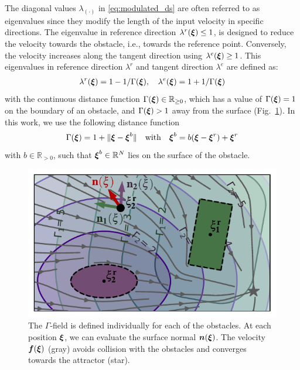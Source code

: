 The  diagonal values $\lambda_{(\cdot)}$  in \eqref{eq:modulated_ds} are often referred to as eigenvalues since they modify the length of the input velocity in specific directions. 
The eigenvalue in reference direction $\lambda^r(\boldsymbol{\xi}) \leq 1$, is designed to reduce the velocity towards the obstacle, i.e., towards the reference point.  
Conversely, the velocity increases along the tangent direction using $\lambda^e(\boldsymbol{\xi}) \geq 1$. This eigenvalues in reference direction $\lambda^r$ and tangent direction $\lambda^e$ are defined as:
\begin{equation}
\begin{split}
    \lambda^r(\vecs \xi) = 1 - 1 /\Gamma(\vecs \xi) , \quad \lambda^e(\vecs \xi) = 1 + 1 / \Gamma(\vecs \xi)
    \label{eq:eigenvalues}
    \end{split}
\end{equation}
with the continuous distance function $\Gamma(\boldsymbol{\xi}) \in \mathbb{R}_{\geq 0}$, which has a value of $\Gamma(\boldsymbol{\xi}) = 1$ on the boundary of an obstacle, and $\Gamma(\boldsymbol{\xi}) > 1$ away from the surface (Fig.~\ref{fig:resultant_normal}). In this work, we use the following distance function
\begin{equation}
  \Gamma(\vecs \xi) = 1 + \| \vecs \xi - \vecs \xi^b \|  
  \quad \text{with} \quad
  \vecs \xi^b = b (\vecs \xi - \vecs \xi^r) + \vecs \xi^r
  \label{eq:distance_function}
\end{equation}
with $b \in \mathbb{R}_{>0}$, such that $\boldsymbol{\xi}^b \in \mathbb{R}^N$ lies on the surface of the obstacle.

\begin{figure}
\centerline{\includegraphics[width=1.0\columnwidth]{figures/normal_and_gamma_field_visualization_annotated.pdf}}
\caption{
The $\Gamma$-field is defined individually for each of the obstacles. At each position $\boldsymbol{\xi}$, we can evaluate the surface normal $\boldsymbol{n}(\boldsymbol{\xi})$. 
The velocity $\boldsymbol{f}(\boldsymbol{\xi})$ (gray) avoids collision with the obstacles and converges towards the attractor (star).}
\label{fig:resultant_normal}
\end{figure}

